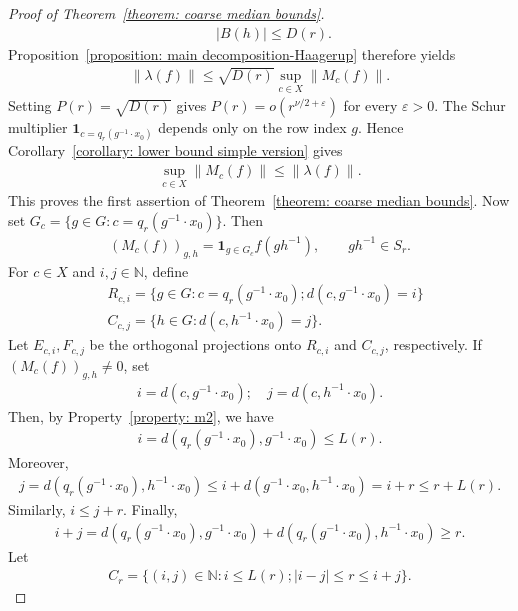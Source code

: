 \documentclass[12pt,reqno]{amsart}
\newcommand{\N}{\mathbb{N}}
\newcommand{\norm}[1]{\left\|#1\right\|}
\numberwithin{equation}{section}
\begin{document}
\begin{proof}[Proof of Theorem~\ref{theorem: coarse median bounds}]
\begin{align*}
        \qquad |B(h)|\le D(r).
    \end{align*}
    Proposition~\ref{proposition: main decomposition-Haagerup} therefore yields
    \begin{align*}
        \norm{\lambda(f)}\le \sqrt{D(r)}\sup_{c\in X}\norm{M_c(f)}.
    \end{align*}
    Setting $P(r)=\sqrt{D(r)}$ gives $P(r)=o(r^{\nu/2+\varepsilon})$ for every $\varepsilon>0$.
    The Schur multiplier $\mathbf{1}_{c=q_r(g^{-1}\cdot x_0)}$ depends only on the row index $g$. Hence Corollary~\ref{corollary: lower bound simple version} gives
    \begin{align*}
        \sup_{c\in X}\norm{M_c(f)} \le \norm{\lambda(f)}.
    \end{align*}
    This proves the first assertion of Theorem~\ref{theorem: coarse median bounds}. Now set $G_c=\{g\in G: c=q_r(g^{-1}\cdot x_0)\}$. Then
    \begin{align*}
        (M_c(f))_{g,h}=\mathbf{1}_{g\in G_c}f(gh^{-1}),\qquad gh^{-1}\in S_r.
    \end{align*}
    For $c\in X$ and $i,j\in \N$, define
    \begin{align*}
        &R_{c,i}=\{g\in G: c=q_{r}(g^{-1}\cdot x_0); d(c,g^{-1}\cdot x_0)=i\}\\
        &C_{c,j}=\{h\in G:d(c,h^{-1}\cdot x_0)=j\}.
    \end{align*}
    Let $E_{c,i},F_{c,j}$ be the orthogonal projections onto $R_{c,i}$ and $C_{c,j}$, respectively. If $(M_c(f))_{g,h}\ne 0$, set
    \begin{align*}
        i=d(c, g^{-1}\cdot x_0);\quad j=d(c,h^{-1}\cdot x_0).
    \end{align*}
    Then, by Property~\ref{property: m2}, we have
    \begin{align*}
        i=d(q_{r}(g^{-1}\cdot x_0),g^{-1}\cdot x_0) \le L(r).
    \end{align*}
    Moreover,
    \begin{align*}
        j=d(q_{r}(g^{-1}\cdot x_0), h^{-1}\cdot x_0)\le i+d(g^{-1}\cdot x_0,h^{-1}\cdot x_0)=i+r\le r+L(r).
    \end{align*}
    Similarly, $i\le j+r$.
    Finally, 
    \begin{align*}
        i+j=d(q_{r}(g^{-1}\cdot x_0), g^{-1}\cdot x_0)+d(q_{r}(g^{-1}\cdot x_0), h^{-1}\cdot x_0)\ge r.
    \end{align*}
    Let
    \begin{align*}
        C_r=\{(i,j)\in \N: i\le L(r);|i-j|\le r\le i+j\}.

\end{align*}
\end{proof}
\end{document}
